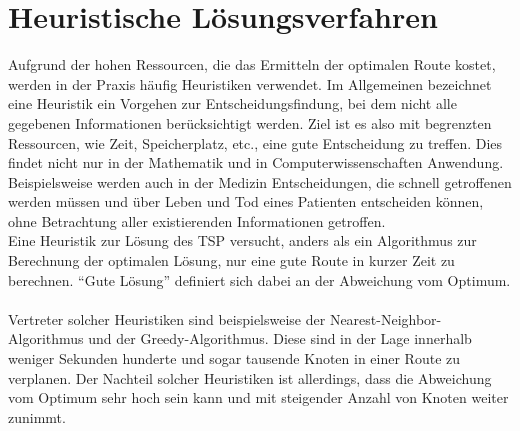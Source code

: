 \section{Heuristische Lösungsverfahren}
Aufgrund der hohen Ressourcen, die das Ermitteln der optimalen Route kostet, werden in der Praxis häufig Heuristiken verwendet.
Im Allgemeinen bezeichnet eine Heuristik ein Vorgehen zur Entscheidungsfindung, bei dem nicht alle gegebenen Informationen berücksichtigt werden.
Ziel ist es also mit begrenzten Ressourcen, wie Zeit, Speicherplatz, etc., eine gute Entscheidung zu treffen.\autocite[S. 14f.]{Gigerenzer.1999}
Dies findet nicht nur in der Mathematik und in Computerwissenschaften Anwendung.
Beispielsweise werden auch in der Medizin Entscheidungen, die schnell getroffenen werden müssen und über Leben und Tod eines Patienten entscheiden können, ohne Betrachtung aller existierenden Informationen getroffen.\autocite[3]{Gigerenzer.1999}
\\
Eine Heuristik zur Lösung des \ac{TSP} versucht, anders als ein Algorithmus zur Berechnung der optimalen Lösung, nur eine gute Route in kurzer Zeit zu berechnen.
\enquote{Gute Lösung} definiert sich dabei an der Abweichung vom Optimum.
\\\\
Vertreter solcher Heuristiken sind beispielsweise der Nearest-Neighbor-Algorithmus und der Greedy-Algorithmus.
Diese sind in der Lage innerhalb weniger Sekunden hunderte und sogar tausende Knoten in einer Route zu verplanen.
Der Nachteil solcher Heuristiken ist allerdings, dass die Abweichung vom Optimum sehr hoch sein kann und mit steigender Anzahl von Knoten weiter zunimmt.\autocite[22]{Johnson.2001}